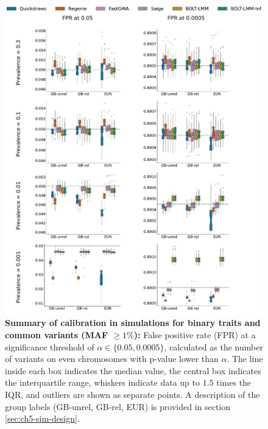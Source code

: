\begin{figure}[h!]
    \centering
    \includegraphics[width=\textwidth]{figures/sim_calibration/bt_fpr_common.pdf}
    \caption{\textbf{Summary of calibration in simulations for binary traits and common variants (MAF $\geq 1\%$): }
    False positive rate (FPR) at a significance threshold of $\alpha \in \{0.05, 0.0005\}$, calculated as the number of variants on even chromosomes with p-value lower than $\alpha$.
    The line inside each box indicates the median value, the central box indicates the interquartile range, whiskers indicate data up to $1.5$ times the IQR, and outliers are shown as separate points.
    A description of the group labels (GB-unrel, GB-rel, EUR) is provided in section \ref{sec:ch5-sim-design}.
    \label{fig:qd_sim_fpr_bt1}
    }
\end{figure}


